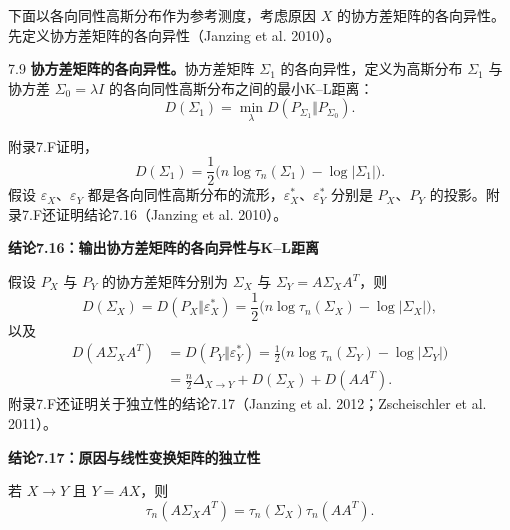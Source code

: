 下面以各向同性高斯分布作为参考测度，考虑原因 $X$ 的协方差矩阵的各向异性。先定义协方差矩阵的各向异性（Janzing et al. 2010）。

\begin{bookdefinition}{7.9}
\textbf{协方差矩阵的各向异性。}协方差矩阵 $\Sigma_1$ 的各向异性，定义为高斯分布 $\Sigma_1$ 与协方差 $\Sigma_0=\lambda I$ 的各向同性高斯分布之间的最小K–L距离：
\begin{equation}
D(\Sigma_1)=\min_\lambda D(P_{\Sigma_1}\Vert P_{\Sigma_0}).
\tag{7.119}
\end{equation}
\end{bookdefinition}
附录7.F证明，
\begin{equation}
D(\Sigma_1)=\frac12\bigl(n\log\tau_n(\Sigma_1)-\log|\Sigma_1|\bigr).
\tag{7.120}
\end{equation}
假设 $\varepsilon_X$、$\varepsilon_Y$ 都是各向同性高斯分布的流形，$\varepsilon_X^*$、$\varepsilon_Y^*$ 分别是 $P_X$、$P_Y$ 的投影。附录7.F还证明结论7.16（Janzing et al. 2010）。

\par\medskip{}\noindent\textbf{结论7.16：输出协方差矩阵的各向异性与K–L距离}\par
假设 $P_X$ 与 $P_Y$ 的协方差矩阵分别为 $\Sigma_X$ 与 $\Sigma_Y=A\Sigma_XA^T$，则
\begin{equation}
D(\Sigma_X)=D(P_X\Vert\varepsilon_X^*)
=\frac12\bigl(n\log\tau_n(\Sigma_X)-\log|\Sigma_X|\bigr),
\tag{7.121}
\end{equation}
以及
\begin{equation}
\begin{aligned}
D(A\Sigma_XA^T)&=D(P_Y\Vert\varepsilon_Y^*)
=\frac12\bigl(n\log\tau_n(\Sigma_Y)-\log|\Sigma_Y|\bigr)\\
&=\frac n2\Delta_{X\to Y}+D(\Sigma_X)+D(AA^T).
\end{aligned}
\tag{7.122}
\end{equation}
附录7.F还证明关于独立性的结论7.17（Janzing et al. 2012；Zscheischler et al. 2011）。

\par\medskip{}\noindent\textbf{结论7.17：原因与线性变换矩阵的独立性}\par
若 $X\to Y$ 且 $Y=AX$，则
\begin{equation}
\tau_n(A\Sigma_XA^T)=\tau_n(\Sigma_X)\tau_n(AA^T).
\tag{7.123}
\end{equation}

